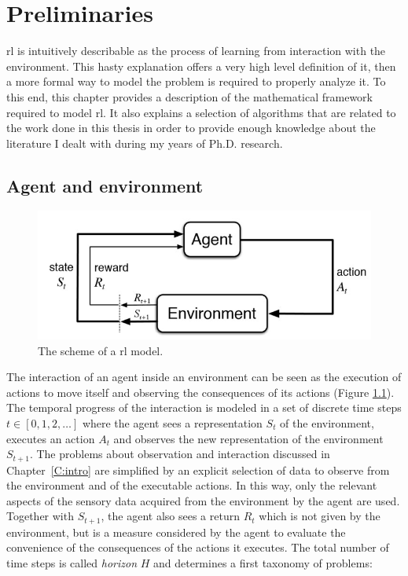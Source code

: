 \chapter{Preliminaries}
\gls{rl} is intuitively describable as the process of learning from interaction with the environment. This hasty explanation offers a very high level definition of it, then a more formal way to model the problem is required to properly analyze it. To this end, this chapter provides a description of the mathematical framework required to model \gls{rl}. It also explains a selection of algorithms that are related to the work done in this thesis in order to provide enough knowledge about the literature I dealt with during my years of Ph.D. research.

\section{Agent and environment}
\begin{figure}[b]
\begin{minipage}{\textwidth}
\begin{center}
  \includegraphics[scale=.75]{img/mdp1.jpg}
\end{center}
\end{minipage}
\caption[Reinforcement Learning problem scheme]{The scheme of a \gls{rl} model.}\label{F:mdp1}
\end{figure}
The interaction of an agent inside an environment can be seen as the execution of actions to move itself and observing the consequences of its actions (Figure \ref{F:mdp1}). The temporal progress of the interaction is modeled in a set of discrete time steps $t \in [0, 1, 2, \dots]$ where the agent sees a representation $S_t$ of the environment, executes an action $A_t$ and observes the new representation of the environment $S_{t+1}$. The problems about observation and interaction discussed in Chapter~\ref{C:intro} are simplified by an explicit selection of data to observe from the environment and of the executable actions. In this way, only the relevant aspects of the sensory data acquired from the environment by the agent are used. Together with $S_{t+1}$, the agent also sees a return $R_t$ which is not given by the environment, but is a measure considered by the agent to evaluate the convenience of the consequences of the actions it executes. The total number of time steps is called \textit{horizon} $H$ and determines a first taxonomy of problems:
